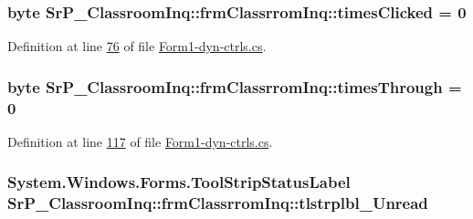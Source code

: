 \hypertarget{class_sr_p___classroom_inq_1_1frm_classrrom_inq_a8b01f872cc35c75e41502f5114a65b74}{
\subsubsection[{times\-Clicked}]{\setlength{\rightskip}{0pt plus 5cm}byte {\bf \-Sr\-P\-\_\-\-Classroom\-Inq\-::frm\-Classrrom\-Inq\-::times\-Clicked} = 0}}
\label{class_sr_p___classroom_inq_1_1frm_classrrom_inq_a8b01f872cc35c75e41502f5114a65b74}


\-Definition at line \hyperlink{_form1-dyn-ctrls_8cs_source_l00076}{76} of file \hyperlink{_form1-dyn-ctrls_8cs_source}{\-Form1-\/dyn-\/ctrls.\-cs}.

\hypertarget{class_sr_p___classroom_inq_1_1frm_classrrom_inq_ab730336bf81938256d6f20922c15484b}{
\subsubsection[{times\-Through}]{\setlength{\rightskip}{0pt plus 5cm}byte {\bf \-Sr\-P\-\_\-\-Classroom\-Inq\-::frm\-Classrrom\-Inq\-::times\-Through} = 0}}
\label{class_sr_p___classroom_inq_1_1frm_classrrom_inq_ab730336bf81938256d6f20922c15484b}


\-Definition at line \hyperlink{_form1-dyn-ctrls_8cs_source_l00117}{117} of file \hyperlink{_form1-dyn-ctrls_8cs_source}{\-Form1-\/dyn-\/ctrls.\-cs}.

\hypertarget{class_sr_p___classroom_inq_1_1frm_classrrom_inq_afe9bef57098dfe8005fc34664f678826}{
\subsubsection[{tlstrplbl\-\_\-\-Unread}]{\setlength{\rightskip}{0pt plus 5cm}\-System.\-Windows.\-Forms.\-Tool\-Strip\-Status\-Label {\bf \-Sr\-P\-\_\-\-Classroom\-Inq\-::frm\-Classrrom\-Inq\-::tlstrplbl\-\_\-\-Unread}}}
\label{class_sr_p___classroom_inq_1_1frm_classrrom_inq_afe9bef57098dfe8005fc34664f678826}


